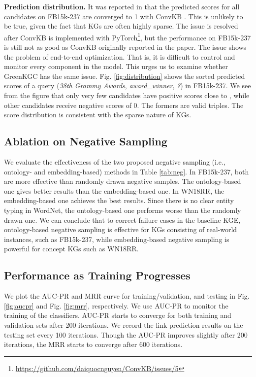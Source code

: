 \documentclass{article}
\begin{document}
\textbf{Prediction distribution.} It was reported in \citet{sun2020evaluation} 
that the predicted scores for all candidates on FB15k-237 are converged to 1 with ConvKB
\citep{nguyen2018novel}.  This is unlikely to be true, given the fact
that KGs are often highly sparse. The issue is resolved after ConvKB is
implemented with PyTorch\footnote{\url{https://github.com/daiquocnguyen/ConvKB/issues/5}}, 
but the performance on FB15k-237 is still not as good as ConvKB
originally reported in the paper. The issue shows the problem of
end-to-end optimization. That is, it is difficult to control and monitor
every component in the model. This urges us to examine whether GreenKGC
has the same issue. Fig. \ref{fig:distribution} shows the sorted
predicted scores of a query (\emph{38th Grammy Awards}, \emph{award\_winner},
\emph{?}) in FB15k-237. We see from the figure that
only very few candidates have positive scores close to , while other
candidates receive negative scores of 0. The formers are valid triples.
The score distribution is consistent with the sparse nature of KGs. 


\subsection{Ablation on Negative Sampling}

We evaluate the 
effectiveness of the two proposed negative sampling
(i.e., ontology- and embedding-based) methods in Table \ref{tab:neg}. In
FB15k-237, both are more effective than randomly drawn negative samples.
The ontology-based one gives better results than the embedding-based
one. In WN18RR, the embedding-based one achieves the best results.
Since there is no clear entity typing in WordNet, the
ontology-based one performs worse than the randomly drawn one. We can
conclude that to correct failure cases in the baseline KGE,
ontology-based negative sampling is effective for KGs consisting of 
real-world instances, such as
FB15k-237, while embedding-based negative sampling is powerful for
concept KGs such as WN18RR. 

{
\color{black}
\subsection{Performance as Training Progresses}

We plot the AUC-PR and MRR curve for training/validation, and testing in Fig. \ref{fig:aucpr} and 
Fig. \ref{fig:mrr}, respectively. We use AUC-PR to monitor the training of the classifiers. AUC-PR
starts to converge for both training and validation sets after 200 iterations. We record the 
link prediction results on the testing set every 100 iterations. Though the AUC-PR improves slightly
after 200 iterations, the MRR starts to converge after 600 iterations.
}
\end{document}
